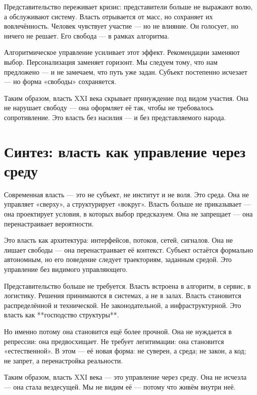 Представительство переживает кризис: представители больше не выражают волю, а обслуживают систему. Власть отрывается от масс, но сохраняет их вовлечённость. Человек чувствует участие — но не влияние. Он голосует, но ничего не решает. Его свобода — в рамках алгоритма.

Алгоритмическое управление усиливает этот эффект. Рекомендации заменяют выбор. Персонализация заменяет горизонт. Мы следуем тому, что нам предложено — и не замечаем, что путь уже задан. Субъект постепенно исчезает — но форма «свободы» сохраняется.

Таким образом, власть XXI века скрывает принуждение под видом участия. Она не нарушает свободу — она оформляет её так, чтобы не требовалось сопротивление. Это власть без насилия — и без представляемого народа.

\section{Синтез: власть как управление через среду}

Современная власть — это не субъект, не институт и не воля. Это среда. Она не управляет «сверху», а структурирует «вокруг». Власть больше не приказывает — она проектирует условия, в которых выбор предсказуем. Она не запрещает — она перенастраивает вероятности.

Это власть как архитектура: интерфейсов, потоков, сетей, сигналов. Она не лишает свободы — она перенастраивает её контекст. Субъект остаётся формально автономным, но его поведение следует траекториям, заданным средой. Это управление без видимого управляющего.

Представительство больше не требуется. Власть встроена в алгоритм, в сервис, в логистику. Решения принимаются в системах, а не в залах. Власть становится распределённой и технической. Не законодательной, а инфраструктурной. Это власть как **господство структуры**.

Но именно потому она становится ещё более прочной. Она не нуждается в репрессии: она предвосхищает. Не требует легитимации: она становится «естественной». В этом — её новая форма: не суверен, а среда; не закон, а код; не запрет, а перенастройка реальности.

Таким образом, власть XXI века — это управление через среду. Она не исчезла — она стала вездесущей. Мы не видим её — потому что живём внутри неё.
